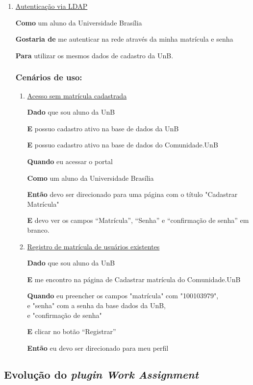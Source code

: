 \begin{enumerate}
\item \underline{Autenticação via LDAP}

\textbf{Como} um aluno da Universidade Brasília

\textbf{Gostaria de} me autenticar na rede através da minha matrícula e senha

\textbf{Para} utilizar os mesmos dados de cadastro da UnB.

\subsubsection*{Cenários de uso:}
\begin{enumerate}
\item \underline{Acesso sem matrícula cadastrada}

\textbf{Dado} que sou aluno da UnB

\textbf{E} possuo cadastro ativo na base de dados da UnB

\textbf{E} possuo cadastro ativo na base de dados do Comunidade.UnB

\textbf{Quando} eu acessar o portal

\textbf{Como} um aluno da Universidade Brasília

\textbf{Então} devo ser direcionado para uma página com o título "Cadastrar Matrícula"

\textbf{E} devo ver os campos ``Matrícula'', ``Senha'' e
``confirmação de senha'' em branco.

\item \underline{Registro de matrícula de usuários existentes}

\textbf{Dado} que sou aluno da UnB

\textbf{E} me encontro na página de Cadastrar matrícula do Comunidade.UnB

\textbf{Quando} eu preencher os campos
"matrícula" com "100103979",\\
e "senha"  com a senha da base dados da UnB,\\
e "confirmação de senha"

\textbf{E} clicar no botão ``Registrar''

\textbf{Então} eu devo ser direcionado para meu perfil
\end{enumerate}
\end{enumerate}

\subsection{Evolução do \textit{plugin Work Assignment}}

